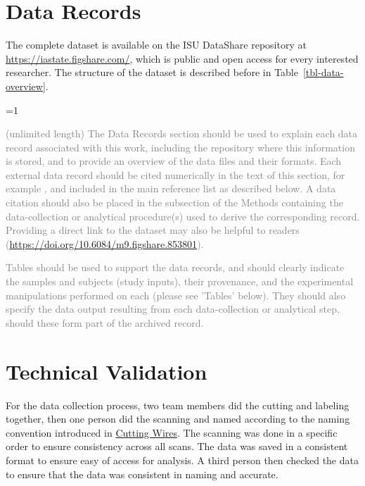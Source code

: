 \documentclass[fleqn,10pt]{wlscirep}
\newcommand{\ifinstruction}{0} %
\begin{document}
\section*{Data Records}\label{sec-data-records}

The complete dataset is available on the ISU DataShare repository at
\href{https://iastate.figshare.com/}{https://iastate.figshare.com/},
which is public and open access for every interested researcher. The
structure of the dataset is described before in
Table~\ref{tbl-data-overview}.

\ifnum \ifinstruction=1

\textcolor{gray}{(unlimited length) The Data Records section should be used to explain each data record associated with this work, including the repository where this information is stored, and to provide an overview of the data files and their formats. Each external data record should be cited numerically in the text of this section, for example \cite{Hao:gidmaps:2014}, and included in the main reference list as described below. A data citation should also be placed in the subsection of the Methods containing the data-collection or analytical procedure(s) used to derive the corresponding record. Providing a direct link to the dataset may also be helpful to readers (\hyperlink{https://doi.org/10.6084/m9.figshare.853801}{https://doi.org/10.6084/m9.figshare.853801}).}

\textcolor{gray}{Tables should be used to support the data records, and should clearly indicate the samples and subjects (study inputs), their provenance, and the experimental manipulations performed on each (please see 'Tables' below). They should also specify the data output resulting from each data-collection or analytical step, should these form part of the archived record.}
\fi

\section*{Technical Validation}\label{sec-technical-validation}

For the data collection process, two team members did the cutting and
labeling together, then one person did the scanning and named according
to the naming convention introduced in
\hyperref[sec-cutting-wires]{Cutting Wires}. The scanning was done in a
specific order to ensure consistency across all scans. The data was
saved in a consistent format to ensure easy of access for analysis. A
third person then checked the data to ensure that the data was
consistent in naming and accurate.
\end{document}
